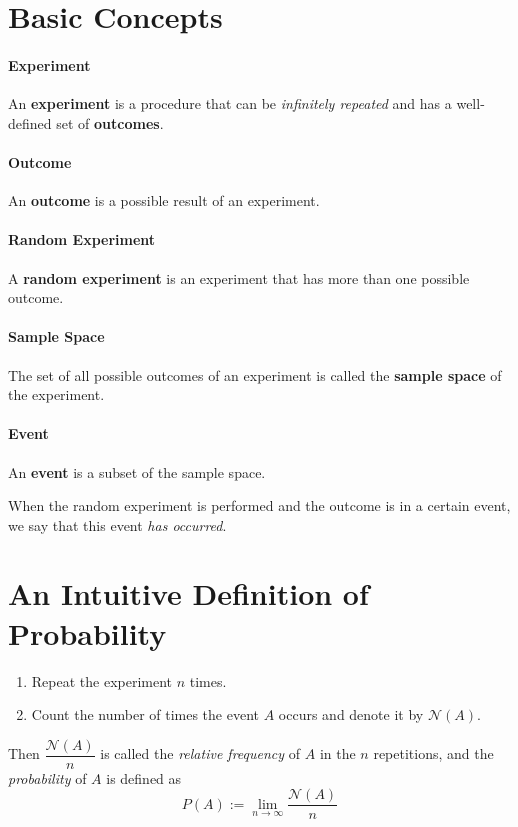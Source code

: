 \documentclass[10pt,UTF8]{article}
\newenvironment{definition box}
{\begin{tcolorbox}[colback=blue!5!white,colframe=blue!75!black,parbox=false,before upper=\par,before lower=\par]}
{\end{tcolorbox}}
\newenvironment{theorem box}
{\begin{tcolorbox}[colback=yellow!5!white,colframe=yellow!75!black,parbox=false,before upper=\par,before lower=\par]}
{\end{tcolorbox}}
\theoremstyle{definition}
\newtheorem{definition inner}{Definition}[section]
\theoremstyle{plain}
\newtheorem{theorem inner}{Theorem}[section]
\theoremstyle{definition}
\newtheorem*{proof inner}{\textit{Proof}}
\theoremstyle{remark}
\begin{document}
\section{Basic Concepts}

\paragraph{Experiment}
An \textbf{experiment} is a procedure that can be \emph{infinitely repeated} and has a well-defined set of \textbf{outcomes}.

\paragraph{Outcome}
An \textbf{outcome} is a possible result of an experiment.

\paragraph{Random Experiment}
A \textbf{random experiment} is an experiment that has more than one possible outcome.

\paragraph{Sample Space}
The set of all possible outcomes of an experiment is called the \textbf{sample space} of the experiment.

\paragraph{Event}
An \textbf{event} is a subset of the sample space.

When the random experiment is performed and the outcome is in a certain event,
we say that this event \emph{has occurred}.


\section{An Intuitive Definition of Probability}

\begin{enumerate}
    \item Repeat the experiment $n$ times.
    \item Count the number of times the event $A$ occurs and denote it by $\mathcal{N}(A)$.
\end{enumerate}

Then $\dfrac{\mathcal{N}(A)}{n}$ is called the \emph{relative frequency} of $A$ in the $n$ repetitions, and the \emph{probability} of $A$ is defined as
\[
P(A) := \lim_{n\to\infty}\frac{\mathcal{N}(A)}{n}
\]
\end{document}
